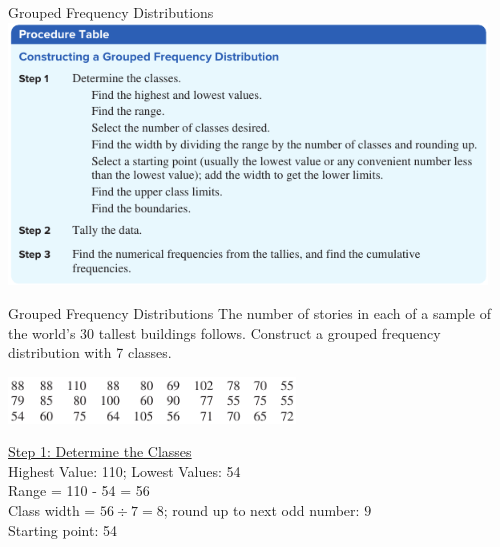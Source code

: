 \documentclass[t, aspectratio=169]{beamer}
\newcommand{\?}{\stackrel{?}{=}}
\begin{document}
	\begin{frame}{Grouped Frequency Distributions}
		\includegraphics[width=5in]{gfd-procedure.png}
	\end{frame}

	\begin{frame}{Grouped Frequency Distributions}
		The number of stories in each of a sample of the world's 30 tallest buildings follows. Construct a grouped frequency distribution with 7 classes.
		
		\includegraphics[width=3in]{building-data.png} \pause
		
		\underline{Step 1: Determine the Classes} \\
		Highest Value: 110; Lowest Values: 54 \pause \\
		Range = 110 - 54 = 56 \pause \\
		Class width = $56 \div 7 = 8$; round up to next odd number: $9$ \pause \\
		Starting point: 54
	\end{frame}
\end{document}
